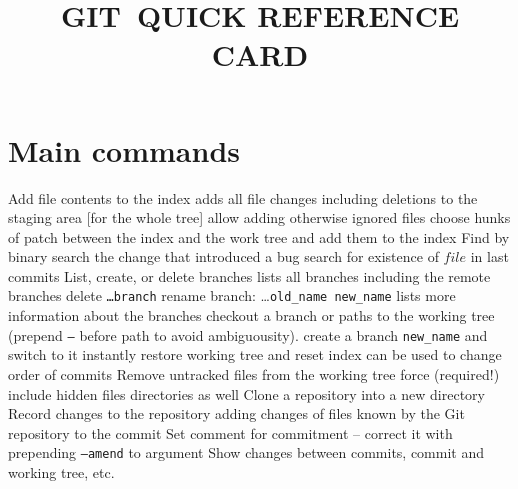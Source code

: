 
\def\content{GIT}
\def\versionnumber{1.1}  %


\def\version{v\versionnumber\ \month\ \year}



\title{\uppercase{\content\ quick reference card}}

\shortintro

\section{Main commands}{}
	{Add file contents to the index}
	{adds all file changes including deletions to the staging area [for the whole tree]}
	{allow adding otherwise ignored files}
	{choose hunks of patch between the index and the work tree and add them to the index}
	{Find by binary search the change that introduced a bug}
	{search for existence of $file$ in last commits}
	{List, create, or delete branches}
	{lists all branches including the remote branches}
	{delete {\tt \dots branch}}
	{rename branch: \dots {\tt old\_name new\_name}}
	{lists more information about the branches}
	{checkout a branch or paths to the working tree (prepend {\tt --} before path to avoid ambiguousity).}
	{create a branch {\tt new\_name} and switch to it instantly}
	{restore working tree and reset index}
	{can be used to change order of commits}
	{Remove untracked files from the working tree}
	{force (required!)}
	{include hidden files}
	{directories as well}
	{Clone a repository into a new directory}
	{Record changes to the repository}
	{adding changes of files known by the Git repository to the commit}
	{Set comment for commitment -- correct it with prepending {\tt --amend} to argument}
	{Show changes between commits, commit and working tree, etc.}
